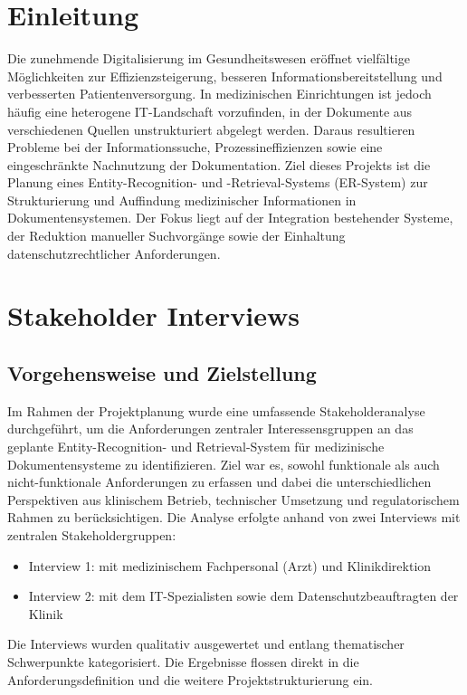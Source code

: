 \setcounter{chapter}{0} %

\chapter{Einleitung}
\label{sec:einleitung}
Die zunehmende Digitalisierung im Gesundheitswesen eröffnet vielfältige Möglichkeiten zur Effizienzsteigerung, besseren Informationsbereitstellung und verbesserten Patientenversorgung. In medizinischen Einrichtungen ist jedoch häufig eine heterogene IT-Landschaft vorzufinden, in der Dokumente aus verschiedenen Quellen unstrukturiert abgelegt werden. Daraus resultieren Probleme bei der Informationssuche, Prozessineffizienzen sowie eine eingeschränkte Nachnutzung der Dokumentation. Ziel dieses Projekts ist die Planung eines Entity-Recognition- und -Retrieval-Systems (ER-System) zur Strukturierung und Auffindung medizinischer Informationen in Dokumentensystemen. Der Fokus liegt auf der Integration bestehender Systeme, der Reduktion manueller Suchvorgänge sowie der Einhaltung datenschutzrechtlicher Anforderungen.

{\let\clearpage\relax
\chapter{Stakeholder Interviews}}
\label{sec:stakeholder_interviews}
\section{Vorgehensweise und Zielstellung}
Im Rahmen der Projektplanung wurde eine umfassende Stakeholderanalyse durchgeführt, um die Anforderungen zentraler Interessensgruppen an das geplante Entity-Recognition- und Retrieval-System für medizinische Dokumentensysteme zu identifizieren. Ziel war es, sowohl funktionale als auch nicht-funktionale Anforderungen zu erfassen und dabei die unterschiedlichen Perspektiven aus klinischem Betrieb, technischer Umsetzung und regulatorischem Rahmen zu berücksichtigen.
Die Analyse erfolgte anhand von zwei Interviews mit zentralen Stakeholdergruppen:
\begin{itemize}
	\item Interview 1: mit medizinischem Fachpersonal (Arzt) und Klinikdirektion
	\item Interview 2: mit dem IT-Spezialisten sowie dem Datenschutzbeauftragten der Klinik
\end{itemize}
Die Interviews wurden qualitativ ausgewertet und entlang thematischer Schwerpunkte kategorisiert. Die Ergebnisse flossen direkt in die Anforderungsdefinition und die weitere Projektstrukturierung ein.
